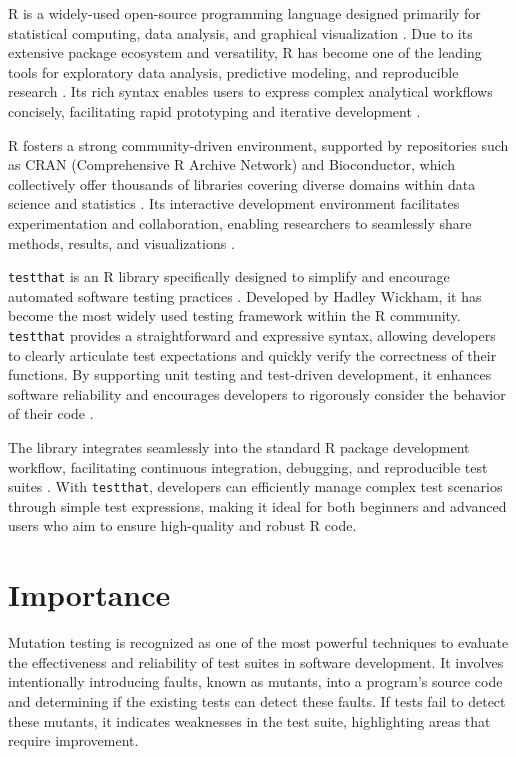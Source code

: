 R is a widely-used open-source programming language designed primarily for statistical computing, data analysis, and graphical visualization \cite{rcore2024}. Due to its extensive package ecosystem and versatility, R has become one of the leading tools for exploratory data analysis, predictive modeling, and reproducible research \cite{wickham2014advanced}. Its rich syntax enables users to express complex analytical workflows concisely, facilitating rapid prototyping and iterative development \cite{wickham2019r4ds}.

R fosters a strong community-driven environment, supported by repositories such as CRAN (Comprehensive R Archive Network) and Bioconductor, which collectively offer thousands of libraries covering diverse domains within data science and statistics \cite{gentleman2004bioconductor}. Its interactive development environment facilitates experimentation and collaboration, enabling researchers to seamlessly share methods, results, and visualizations \cite{wickham2019r4ds}.

\texttt{testthat} is an R library specifically designed to simplify and encourage automated software testing practices \cite{wickham2011testthat}. Developed by Hadley Wickham, it has become the most widely used testing framework within the R community. \texttt{testthat} provides a straightforward and expressive syntax, allowing developers to clearly articulate test expectations and quickly verify the correctness of their functions. By supporting unit testing and test-driven development, it enhances software reliability and encourages developers to rigorously consider the behavior of their code \cite{wickham2015rpackages}.

The library integrates seamlessly into the standard R package development workflow, facilitating continuous integration, debugging, and reproducible test suites \cite{wickham2015rpackages}. With \texttt{testthat}, developers can efficiently manage complex test scenarios through simple test expressions, making it ideal for both beginners and advanced users who aim to ensure high-quality and robust R code.



\section{Importance}

Mutation testing is recognized as one of the most powerful techniques to evaluate the effectiveness and reliability of test suites in software development. It involves intentionally introducing faults, known as mutants, into a program's source code and determining if the existing tests can detect these faults. If tests fail to detect these mutants, it indicates weaknesses in the test suite, highlighting areas that require improvement.


